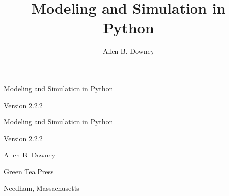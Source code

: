 \documentclass[12pt]{book}
\title{Modeling and Simulation in Python}
\author{Allen B. Downey}
\newcommand{\thetitle}{Modeling and Simulation in Python}
\newcommand{\theauthors}{Allen B. Downey}
\newcommand{\theversion}{2.2.2}
\theoremstyle{exercise}
\newcommand\blankpage{%
    \null
    \thispagestyle{empty}%
    \addtocounter{page}{-1}%
    \newpage}
\newif\ifplastex
\begin{document}
\frontmatter

\ifplastex

\maketitle

\else

\begin{latexonly}

\thispagestyle{empty}

\begin{flushright}
\vspace*{2.0in}

\begin{spacing}{3}
{\huge \thetitle}
\end{spacing}

\vspace{0.25in}

Version \theversion

\vfill

\end{flushright}


\afterpage{\blankpage}


\pagebreak
\thispagestyle{empty}

\begin{flushright}
\vspace*{2.0in}

\begin{spacing}{3}
{\huge \thetitle}
\end{spacing}

\vspace{0.25in}

Version \theversion

\vspace{1in}


{\Large
\theauthors \\
}


\vspace{0.5in}

{\Large Green Tea Press}

{\small Needham, Massachusetts}


\end{flushright}
\end{latexonly}
\end{document}
